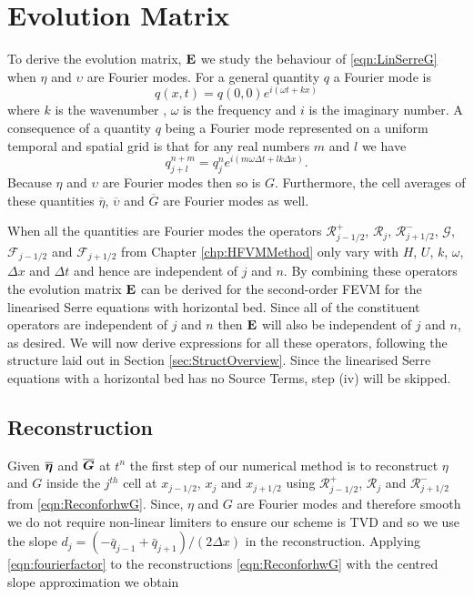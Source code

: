 \section{Evolution Matrix}
To derive the evolution matrix, $\mathbf{E}$ we study the behaviour of \eqref{eqn:LinSerreG} when $\eta$ and $\upsilon$ are Fourier modes. For a general quantity $q$ a Fourier mode is
\begin{equation}
q(x,t) = q(0,0) e^{i\left(\omega t + kx\right)}
\label{eqn:FourierNode}
\end{equation}
where $k$ is the wavenumber , $\omega$ is the frequency and $i$ is the imaginary number. A consequence of a quantity $q$ being a Fourier mode represented on a uniform temporal and spatial grid is that for any real numbers $m$ and $l$ we have
\begin{equation}
q^{n + m}_{j + l} = q^n_j e^{ i \left(m \omega \Delta t + l k \Delta x\right)}.
\label{eqn:fourierfactor}
\end{equation}
Because $\eta$ and $\upsilon$ are Fourier modes then so is $G$. Furthermore, the cell averages of these quantities $\overline{\eta}$, $\overline{\upsilon}$ and $\overline{G}$ are Fourier modes as well.

When all the quantities are Fourier modes the operators $\mathcal{R}^+_{j-1/2}$, $\mathcal{R}_{j}$, $\mathcal{R}^-_{j+1/2}$, $\mathcal{G}$, $\mathcal{F}_{j-1/2}$ and $\mathcal{F}_{j+1/2}$ from Chapter \ref{chp:HFVMMethod} only vary with $H$, $U$, $k$, $\omega$, $\Delta x$ and $\Delta t$ and hence are independent of $j$ and $n$. By combining these operators the evolution matrix $\mathbf{E}$ can be derived for the second-order FEVM for the linearised Serre equations with horizontal bed. Since all of the constituent operators are independent of $j$ and $n$ then $\mathbf{E}$ will also be independent of $j$ and $n$, as desired. We will now derive expressions for all these operators, following the structure laid out in Section \ref{sec:StructOverview}. Since the linearised Serre equations with a horizontal bed has no Source Terms, step (iv) will be skipped.   

\setcounter{subsection}{0}
\renewcommand{\thesubsection}{(\roman{subsection})} 
\subsection{Reconstruction}
Given $\overline{\boldsymbol{\eta}}$ and $\overline{\boldsymbol{G}}$ at $t^n$ the first step of our numerical method is to reconstruct $\eta$ and $G$ inside the $j^{th}$ cell at $x_{j-1/2}$, $x_j$ and $x_{j+1/2}$ using $\mathcal{R}^+_{j-1/2}$, $\mathcal{R}_{j}$ and $\mathcal{R}^-_{j+1/2}$ from \eqref{eqn:ReconforhwG}. Since, $\eta$ and $G$ are Fourier modes and therefore smooth we do not require non-linear limiters to ensure our scheme is TVD and so we use the slope $d_j = \left({-\bar{q}_{j-1} +\bar{q}_{j+1}}\right)/ \left({2\Delta x} \right)$ in the reconstruction. Applying \eqref{eqn:fourierfactor} to the reconstructions \eqref{eqn:ReconforhwG} with the centred slope approximation we obtain 

